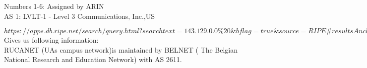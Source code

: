 Numbers 1-6: Assigned by ARIN \\
AS 1: LVLT-1 - Level 3 Communications, Inc.,US

$https://apps.db.ripe.net/search/query.html?searchtext=143.129.0.0\%20\&bflag=true\&source=RIPE\#resultsAnchor$ \\
Gives us following information:\\
RUCANET (UAs campus network)is maintained by BELNET ( The Belgian National Research and Education Network) with AS 2611.
